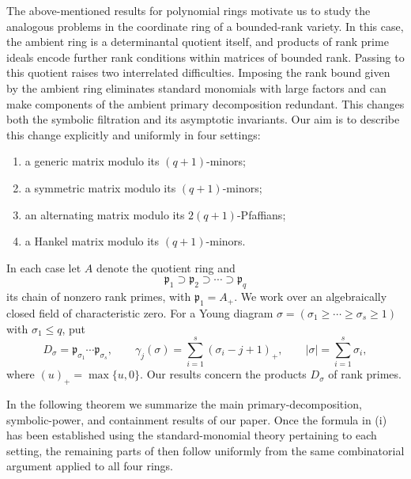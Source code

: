 \documentclass[11pt,reqno]{amsart}
\numberwithin{equation}{subsection}
\theoremstyle{definition}
\theoremstyle{remark}
\newcommand{\fp}{\mathfrak p}
\begin{document}
The above-mentioned results for polynomial rings motivate us to study  the analogous problems in the coordinate ring of a bounded-rank variety. In this case, the ambient ring is a determinantal quotient itself, and products of rank prime ideals encode further rank conditions within matrices of bounded rank. Passing to this quotient raises two interrelated difficulties.
Imposing the rank bound given by the ambient ring eliminates standard monomials with large factors and can make components of the ambient primary decomposition redundant. This changes both the symbolic filtration and its asymptotic invariants. Our aim is to describe this change explicitly and uniformly in four settings:
\begin{enumerate}[label=\textup{(\roman*)}]
\item a generic matrix modulo its $(q+1)$-minors;
\item a symmetric matrix modulo its $(q+1)$-minors;
\item an alternating matrix modulo its $2(q+1)$-Pfaffians;
\item a Hankel matrix modulo its $(q+1)$-minors. 
\end{enumerate}

In each case let $A$ denote the quotient ring and
\[
 \fp_1\supset\fp_2\supset\cdots\supset\fp_q
\]
its chain of nonzero rank primes, with $\fp_1=A_+$.
We work over an algebraically closed field of characteristic zero.
For a Young diagram $\sigma=(\sigma_1\ge\cdots\ge\sigma_s\ge1)$ with
$\sigma_1\le q$, put
\[
 D_\sigma=\fp_{\sigma_1}\cdots\fp_{\sigma_s},
 \qquad
 \gamma_j(\sigma)=\sum_{i=1}^s(\sigma_i-j+1)_+,
 \qquad |\sigma|=\sum_{i=1}^s \sigma_i,
\]
where $(u)_+=\max\{u,0\}$.
Our results concern the products $D_\sigma$ of rank primes.


In the following theorem we summarize the main primary-decomposition, symbolic-power, and containment results of our paper. 
Once the formula in  (i) has been established using the standard-monomial theory pertaining to each setting, the remaining parts of  then follow uniformly from the same combinatorial argument applied to all four rings.
\end{document}
